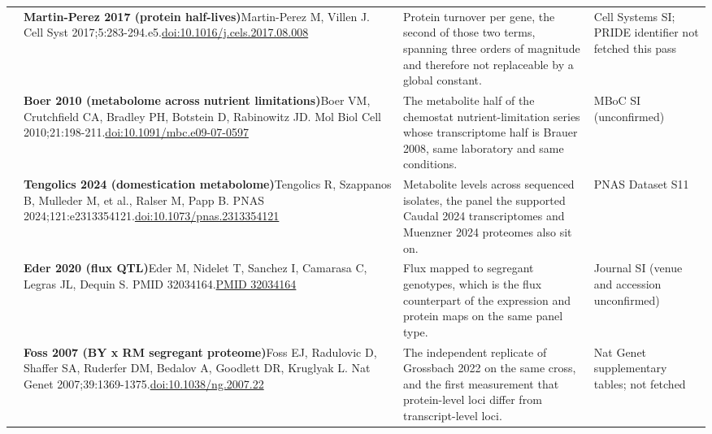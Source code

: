 \begin{landscape}
\begin{longtable}{@{}r@{\hspace{4pt}} L{86mm} L{92mm} L{62mm}@{}}
 & \textbf{Martin-Perez 2017 (protein half-lives)}\newline Martin-Perez M, Villen J. Cell Syst 2017;5:283-294.e5.\newline \href{https://doi.org/10.1016/j.cels.2017.08.008}{doi:10.1016/\allowbreak j.cels.2017.08.008} & Protein turnover per gene, the second of those two terms, spanning three orders of magnitude and therefore not replaceable by a global constant. & Cell Systems SI; PRIDE identifier not fetched this pass \\
 & \textbf{Boer 2010 (metabolome across nutrient limitations)}\newline Boer VM, Crutchfield CA, Bradley PH, Botstein D, Rabinowitz JD. Mol Biol Cell 2010;21:198-211.\newline \href{https://doi.org/10.1091/mbc.e09-07-0597}{doi:10.1091/\allowbreak mbc.e09-07-0597} & The metabolite half of the chemostat nutrient-limitation series whose transcriptome half is Brauer 2008, same laboratory and same conditions. & MBoC SI (unconfirmed) \\
 & \textbf{Tengolics 2024 (domestication metabolome)}\newline Tengolics R, Szappanos B, Mulleder M, et al., Ralser M, Papp B. PNAS 2024;121:e2313354121.\newline \href{https://doi.org/10.1073/pnas.2313354121}{doi:10.1073/\allowbreak pnas.2313354121} & Metabolite levels across sequenced isolates, the panel the supported Caudal 2024 transcriptomes and Muenzner 2024 proteomes also sit on. & PNAS Dataset S11 \\
 & \textbf{Eder 2020 (flux QTL)}\newline Eder M, Nidelet T, Sanchez I, Camarasa C, Legras JL, Dequin S. PMID 32034164.\newline \href{https://pubmed.ncbi.nlm.nih.gov/32034164/}{PMID 32034164} & Flux mapped to segregant genotypes, which is the flux counterpart of the expression and protein maps on the same panel type. & Journal SI (venue and accession unconfirmed) \\
 & \textbf{Foss 2007 (BY x RM segregant proteome)}\newline Foss EJ, Radulovic D, Shaffer SA, Ruderfer DM, Bedalov A, Goodlett DR, Kruglyak L. Nat Genet 2007;39:1369-1375.\newline \href{https://doi.org/10.1038/ng.2007.22}{doi:10.1038/\allowbreak ng.2007.22} & The independent replicate of Grossbach 2022 on the same cross, and the first measurement that protein-level loci differ from transcript-level loci. & Nat Genet supplementary tables; not fetched \\

\end{longtable}
\end{landscape}
